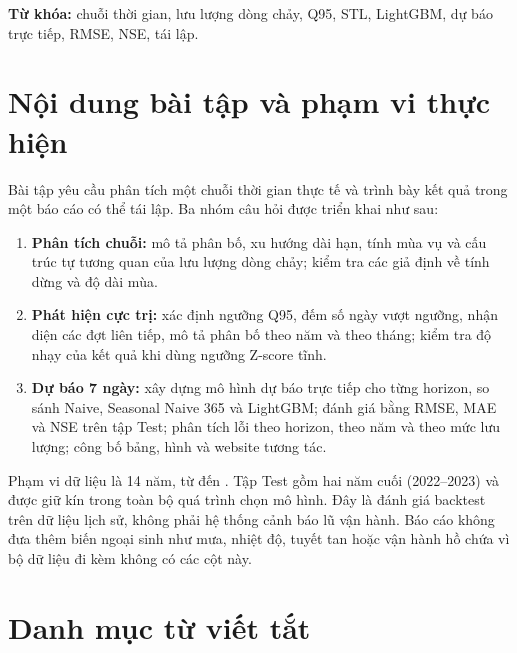 \vspace{0.5em}
\noindent\textbf{Từ khóa:} chuỗi thời gian, lưu lượng dòng chảy, Q95, STL,
LightGBM, dự báo trực tiếp, RMSE, NSE, tái lập.

\newpage
\section*{Nội dung bài tập và phạm vi thực hiện}

Bài tập yêu cầu phân tích một chuỗi thời gian thực tế và trình bày kết quả trong
một báo cáo có thể tái lập. Ba nhóm câu hỏi được triển khai như sau:

\begin{enumerate}[leftmargin=1.6em]
  \item \textbf{Phân tích chuỗi:} mô tả phân bố, xu hướng dài hạn, tính mùa vụ và
  cấu trúc tự tương quan của lưu lượng dòng chảy; kiểm tra các giả định về tính
  dừng và độ dài mùa.
  \item \textbf{Phát hiện cực trị:} xác định ngưỡng Q95, đếm số ngày vượt ngưỡng,
  nhận diện các đợt liên tiếp, mô tả phân bố theo năm và theo tháng; kiểm tra độ
  nhạy của kết quả khi dùng ngưỡng Z-score tĩnh.
  \item \textbf{Dự báo 7 ngày:} xây dựng mô hình dự báo trực tiếp cho từng horizon,
  so sánh Naive, Seasonal Naive 365 và LightGBM; đánh giá bằng RMSE, MAE và NSE
  trên tập Test; phân tích lỗi theo horizon, theo năm và theo mức lưu lượng; công
  bố bảng, hình và website tương tác.
\end{enumerate}

Phạm vi dữ liệu là 14 năm, từ \DateMin{} đến \DateMax{}. Tập Test gồm hai
năm cuối (2022--2023) và được giữ kín trong toàn bộ quá trình chọn mô hình. Đây là
đánh giá backtest trên dữ liệu lịch sử, không phải hệ thống cảnh báo lũ vận hành.
Báo cáo không đưa thêm biến ngoại sinh như mưa, nhiệt độ, tuyết tan hoặc vận hành
hồ chứa vì bộ dữ liệu đi kèm không có các cột này.

\newpage
\tableofcontents
\newpage
\listoftables
\newpage
\listoffigures

\newpage
\section*{Danh mục từ viết tắt}

